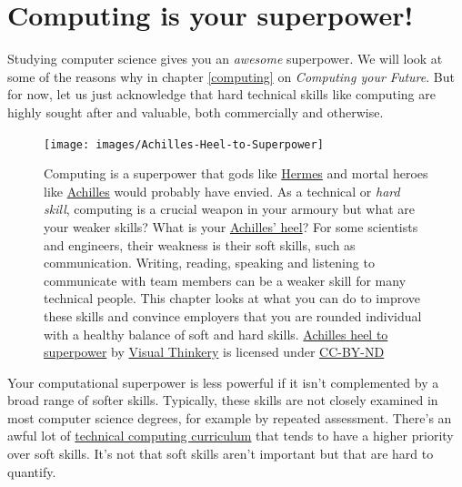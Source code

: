 \documentclass[
]{book}
\begin{document}
\hypertarget{superpower}{%
\section{Computing is your superpower!}\label{superpower}}

Studying computer science gives you an \emph{awesome} superpower. We will look at some of the reasons why in chapter \ref{computing} on \emph{Computing your Future}. But for now, let us just acknowledge that hard technical skills like computing are highly sought after and valuable, both commercially and otherwise.

\begin{figure}

{\centering \texttt{[image: images/Achilles-Heel-to-Superpower]} 

}

\caption{Computing is a superpower that gods like \href{https://en.wikipedia.org/wiki/Hermes}{Hermes} and mortal heroes like \href{https://en.wikipedia.org/wiki/Achilles}{Achilles} would probably have envied. \citep{heroes, mythos} As a technical or \emph{hard skill}, computing is a crucial weapon in your armoury but what are your weaker skills? What is your \href{https://en.wikipedia.org/wiki/Achilles\%27_heel}{Achilles' heel}? For some scientists and engineers, their weakness is their soft skills, such as communication. Writing, reading, speaking and listening to communicate with team members can be a weaker skill for many technical people. This chapter looks at what you can do to improve these skills and convince employers that you are rounded individual with a healthy balance of soft and hard skills. \href{https://bryanmmathers.com/achilles-heel-to-superpower/}{Achilles heel to superpower} by \href{https://visualthinkery.com}{Visual Thinkery} is licensed under \href{https://creativecommons.org/licenses/by-nd/4.0/}{CC-BY-ND}}\label{fig:achilles-fig}
\end{figure}



Your computational superpower is less powerful if it isn't complemented by a broad range of softer skills. Typically, these skills are not closely examined in most computer science degrees, for example by repeated assessment. There's an awful lot of \href{https://www.acm.org/education/curricula-recommendations}{technical computing curriculum} that tends to have a higher priority over soft skills. It's not that soft skills aren't important but that are hard to quantify.
\end{document}
